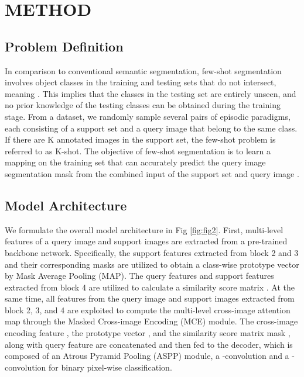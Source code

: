 \documentclass[conference]{IEEEtran}
\begin{document}
\section{METHOD}

\subsection{Problem Definition}
In comparison to conventional semantic segmentation, few-shot segmentation involves object classes in the training and testing sets that do not intersect, meaning . This implies that the classes in the testing set are entirely unseen, and no prior knowledge of the testing classes can be obtained during the training stage. From a dataset, we randomly sample several pairs of episodic paradigms, each consisting of a support set  and a query image  that belong to the same class. If there are K annotated images in the support set, the few-shot problem is referred to as K-shot. The objective of few-shot segmentation is to learn a mapping  on the training set  that can accurately predict the query image segmentation mask  from the combined input of the support set  and query image .

\subsection{Model Architecture}

We formulate the overall model architecture in Fig \ref{fig:fig2}. First, multi-level features of a query image and support images are extracted from a pre-trained backbone network. Specifically, the support features extracted from block 2 and 3 and their corresponding masks are utilized to obtain a class-wise prototype vector  by Mask Average Pooling (MAP). The query features and support features extracted from block 4 are utilized to calculate a similarity score matrix . At the same time, all features from the query image and support images extracted from block 2, 3, and 4 are exploited to compute the multi-level cross-image attention map  through the Masked Cross-image Encoding (MCE) module. The cross-image encoding feature , the prototype vector , and the similarity score matrix mask , along with query feature  are concatenated and then fed to the decoder, which is composed of an Atrous Pyramid Pooling (ASPP) module, a -convolution and a -convolution for binary pixel-wise classification.
\end{document}
